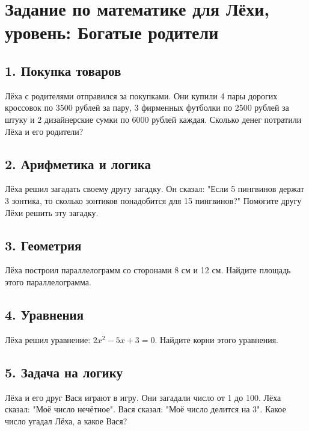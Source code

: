 \documentclass{article}
\begin{document}
\section*{Задание по математике для Лёхи, уровень: Богатые родители}

\subsection*{1. Покупка товаров}

Лёха с родителями отправился за покупками. Они купили 4 пары дорогих кроссовок по 3500 рублей за пару, 3 фирменных футболки по 2500 рублей за штуку и 2 дизайнерские сумки по 6000 рублей каждая. Сколько денег потратили Лёха и его родители?

\subsection*{2. Арифметика и логика}

Лёха решил загадать своему другу загадку. Он сказал: "Если 5 пингвинов держат 3 зонтика, то сколько зонтиков понадобится для 15 пингвинов?" Помогите другу Лёхи решить эту загадку.

\subsection*{3. Геометрия}

Лёха построил параллелограмм со сторонами 8 см и 12 см. Найдите площадь этого параллелограмма.

\subsection*{4. Уравнения}

Лёха решил уравнение: $2x^2 - 5x + 3 = 0$. Найдите корни этого уравнения.

\subsection*{5. Задача на логику}

Лёха и его друг Вася играют в игру. Они загадали число от 1 до 100. Лёха сказал: "Моё число нечётное". Вася сказал: "Моё число делится на 3". Какое число угадал Лёха, а какое Вася?
\end{document}
